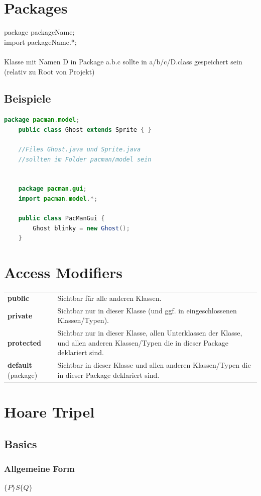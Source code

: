 \documentclass[12pt,a4paper]{article}
\begin{document}
\section{Packages}
package packageName;\\
import packageName.*;\\\\
Klasse mit Namen D in Package a.b.c sollte in a/b/c/D.class gespeichert sein (relativ zu Root von Projekt)
\subsection{Beispiele}
\begin{lstlisting}[language=Java]
	package pacman.model;
	public class Ghost extends Sprite { }

	//Files Ghost.java und Sprite.java
	//sollten im Folder pacman/model sein


	package pacman.gui;
	import pacman.model.*;

	public class PacManGui {
		Ghost blinky = new Ghost();
	}
\end{lstlisting}
\newpage
\section{Access Modifiers}
\begin{tabularx}{\linewidth}{ l X }
\textbf{public} & Sichtbar für alle anderen Klassen.\\
\textbf{private} & Sichtbar nur in dieser Klasse (und ggf. in eingeschlossenen Klassen/Typen).\\
\textbf{protected} & Sichtbar nur in dieser Klasse, allen Unterklassen der Klasse, und allen anderen Klassen/Typen die in dieser Package deklariert sind.\\
\textbf{default} (package) & Sichtbar in dieser Klasse und allen anderen Klassen/Typen die in dieser Package deklariert sind.
\end{tabularx}
\section{Hoare Tripel}
\subsection{Basics} %
\subsubsection{Allgemeine Form}
$\{P\} S \{Q\}$\\
\end{document}
